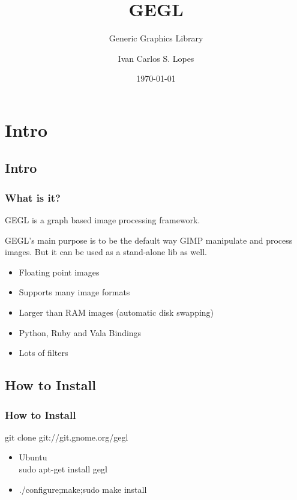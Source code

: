 \documentclass{beamer}
\title{GEGL}
\subtitle{Generic Graphics Library}
\author{Ivan Carlos S. Lopes}
\date{\today}
\begin{document}
\begin{frame}
\titlepage
\begin{center}
\end{center}
\end{frame}

\section[Contents]{}
\frame{\tableofcontents}

\section{Intro}

\subsection{Intro}

\begin{frame}
  \frametitle{What is it?}
GEGL is a graph based image processing framework.

GEGL's main purpose is to be the default way GIMP manipulate and
process images. But it can be used as a stand-alone lib as well.

  \begin{itemize}
    \item{Floating point images}
    \item{Supports many image formats}
    \item{Larger than RAM images (automatic disk swapping)}
    \item{Python, Ruby and Vala Bindings}
    \item{Lots of filters}
  \end{itemize}
\end{frame}

\subsection{How to Install}

\begin{frame}
  \frametitle{How to Install}

git clone git://git.gnome.org/gegl
\begin{itemize}
  \item{Ubuntu \\ sudo apt-get install gegl}
  \pause
  \item{./configure;make;sudo make install}
\end{itemize}
\end{frame}
\end{document}
